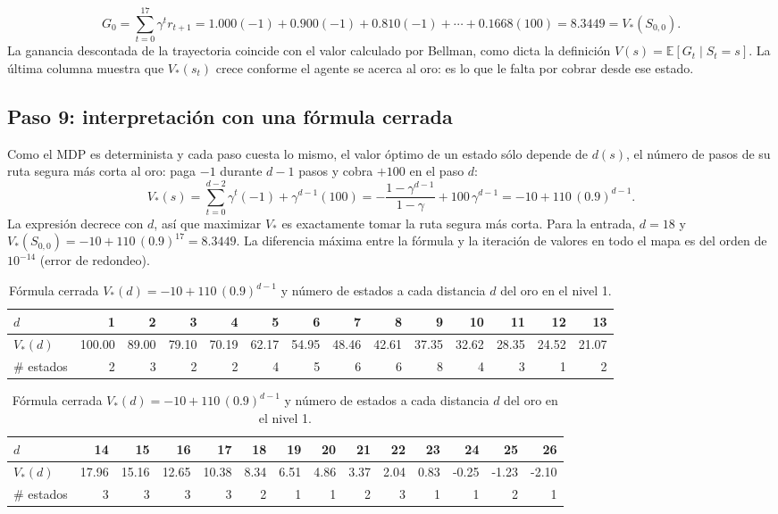 \documentclass[11pt,letterpaper]{article}
\begin{document}
\begin{equation}
G_0 = \sum_{t=0}^{17} \gamma^t r_{t+1} = 1.000(-1) + 0.900(-1) + 0.810(-1) + \cdots + 0.1668(100) = 8.3449 = V_*(S_{0,0}).
\end{equation}
La ganancia descontada de la trayectoria coincide con el valor calculado por Bellman, como dicta la definición $V(s) = \mathbb{E}[G_t \mid S_t = s]$. La última columna muestra que $V_*(s_t)$ crece conforme el agente se acerca al oro: es lo que le falta por cobrar desde ese estado.

\subsection{Paso 9: interpretación con una fórmula cerrada}
Como el MDP es determinista y cada paso cuesta lo mismo, el valor óptimo de un estado sólo depende de $d(s)$, el número de pasos de su ruta segura más corta al oro: paga $-1$ durante $d-1$ pasos y cobra $+100$ en el paso $d$:
\begin{equation}
V_*(s) = \sum_{t=0}^{d-2} \gamma^t (-1) + \gamma^{d-1}(100) = -\frac{1-\gamma^{d-1}}{1-\gamma} + 100\,\gamma^{d-1} = -10 + 110\,(0.9)^{d-1}.
\end{equation}
La expresión decrece con $d$, así que maximizar $V_*$ es exactamente tomar la ruta segura más corta. Para la entrada, $d = 18$ y $V_*(S_{0,0}) = -10 + 110\,(0.9)^{17} = 8.3449$. La diferencia máxima entre la fórmula y la iteración de valores en todo el mapa es del orden de $10^{-14}$ (error de redondeo).

\begin{table}[H]
\centering
\scriptsize
\setlength{\tabcolsep}{3pt}
\caption{Fórmula cerrada $V_*(d) = -10 + 110\,(0.9)^{d-1}$ y número de estados a cada distancia $d$ del oro en el nivel 1.}
\label{tab:cerrada}
\begin{tabular}{lrrrrrrrrrrrrr}
\toprule
$d$ & 1 & 2 & 3 & 4 & 5 & 6 & 7 & 8 & 9 & 10 & 11 & 12 & 13 \\
\midrule
$V_*(d)$ & 100.00 & 89.00 & 79.10 & 70.19 & 62.17 & 54.95 & 48.46 & 42.61 & 37.35 & 32.62 & 28.35 & 24.52 & 21.07 \\
\# estados & 2 & 3 & 2 & 2 & 4 & 5 & 6 & 6 & 8 & 4 & 3 & 1 & 2 \\
\bottomrule
\end{tabular}

\vspace{4pt}
\begin{tabular}{lrrrrrrrrrrrrr}
\toprule
$d$ & 14 & 15 & 16 & 17 & 18 & 19 & 20 & 21 & 22 & 23 & 24 & 25 & 26 \\
\midrule
$V_*(d)$ & 17.96 & 15.16 & 12.65 & 10.38 & 8.34 & 6.51 & 4.86 & 3.37 & 2.04 & 0.83 & -0.25 & -1.23 & -2.10 \\
\# estados & 3 & 3 & 3 & 3 & 2 & 1 & 1 & 2 & 3 & 1 & 1 & 2 & 1 \\
\bottomrule
\end{tabular}
\end{table}
\end{document}
